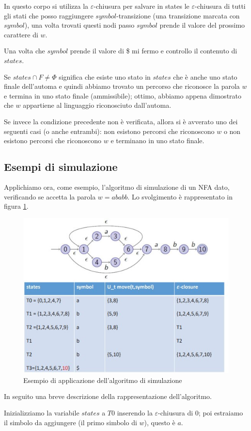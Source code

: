 \documentclass[class=book, crop=false, oneside, 12pt]{standalone}
\begin{document}
In questo corpo si utilizza la \(\varepsilon\)-chiusura per salvare in states le \(\varepsilon\)-chiusura di tutti gli stati che posso raggiungere \(symbol\)-transizione (una transizione marcata con \(symbol\)), una volta trovati questi nodi passo \(symbol\) prende il valore del prossimo carattere di \(w\).

Una volta che \(symbol\) prende il valore di \$ mi fermo e controllo il contenuto di \(states\).

Se \(states \cap F \neq \Phi\) significa che esiste uno stato in \(states\) che è anche uno stato finale dell'automa e quindi abbiamo trovato un percorso che riconosce la parola \(w\) e termina in uno stato finale (ammissibile); ottimo, abbiamo appena dimostrato che \(w\) appartiene al linguaggio riconosciuto dall'automa.

Se invece la condizione precedente non è verificata, allora si è avverato uno dei seguenti casi (o anche entrambi): non esistono percorsi che riconoscono \(w\) o non esistono percorsi che riconoscono \(w\) e terminano in uno stato finale.


\subsection{Esempi di simulazione}
Applichiamo ora, come esempio, l'algoritmo di simulazione di un NFA dato, verificando se accetta la parola \(w  = ababb\). Lo svolgimento è rappresentato in figura \ref{simulazione_es_1}.

\begin{figure}
    \centering
    \includegraphics[width=.6\textwidth,keepaspectratio]{simulazione_es_1}
    \caption{Esempio di applicazione dell'algoritmo di simulazione}
    \label{simulazione_es_1}
\end{figure}
In seguito una breve descrizione della rappresentazione dell'algoritmo.

Inizializziamo la variabile \(states\) a \(T0\) inserendo la \(\varepsilon\)-chiusura di 0; poi estraiamo il simbolo da aggiungere (il primo simbolo di \(w\)), questo è \(a\).
\end{document}
